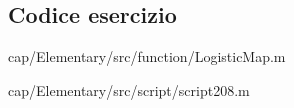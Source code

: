 \subsection{Codice esercizio}

{cap/Elementary/src/function/LogisticMap.m}


{cap/Elementary/src/script/script208.m}
